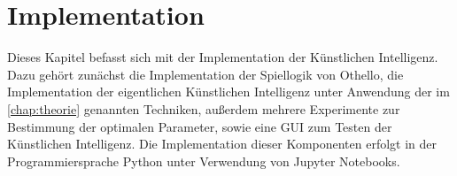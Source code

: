 
\chapter{Implementation}
\label{chap:implementation}

Dieses Kapitel befasst sich mit der Implementation der Künstlichen Intelligenz. Dazu gehört zunächst die Implementation
der Spiellogik von Othello, die Implementation der eigentlichen Künstlichen Intelligenz unter Anwendung der im
\autoref{chap:theorie} genannten Techniken, außerdem mehrere Experimente zur Bestimmung der optimalen Parameter, sowie eine \ac{GUI}
zum Testen der Künstlichen Intelligenz. Die Implementation dieser Komponenten erfolgt in der
Programmiersprache Python unter Verwendung von Jupyter Notebooks. 







